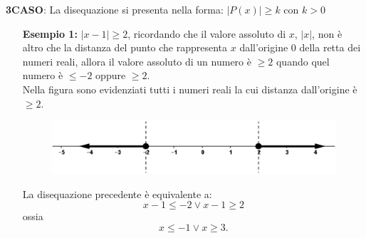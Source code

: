 \textbf{3\textdegree CASO}: La disequazione si presenta nella forma:  
$|P(x)|\geq k$ con $k> 0$\\

\begin{enumerate}
        \item [\textbf{Esempio 1:}] $|x-1|\geq 2$, ricordando che il valore 
assoluto di $x$, $|x|$, non è altro che la distanza del punto che rappresenta 
$x$ dall'origine 0 della retta dei numeri reali, allora il valore assoluto di 
un 
numero è $\geq 2$ quando quel numero è $\leq -2$ oppure $\geq 2$.\\
        Nella figura sono evidenziati tutti i numeri reali la cui distanza 
dall'origine è $\geq 2$.

\begin{figure}[h]
\begin{inaccessibleblock}[TODO]
\centering
\includegraphics[width=0.9\linewidth]{img/imm5} %
\end{inaccessibleblock}
\label{fig:abs_imm5}
\end{figure}

        La disequazione precedente è equivalente a:
        $$x-1\leq -2 \vee x-1 \geq 2$$
        ossia
        $$x\leq -1 \vee x\geq 3.$$

        
\end{enumerate}




            



















